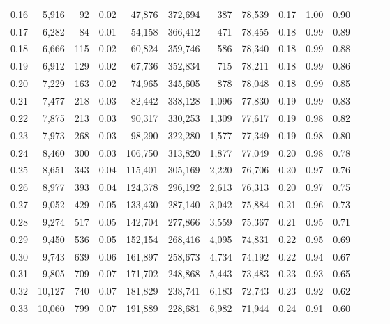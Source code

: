 \begin{tabular}{rrrrrrrrrrrrrr}
0.16 &   5,916 &     92 &  0.02 &   47,876 &  372,694 &     387 &  78,539 &  0.17 &  1.00 &      0.90 \\
0.17 &   6,282 &     84 &  0.01 &   54,158 &  366,412 &     471 &  78,455 &  0.18 &  0.99 &      0.89 \\
0.18 &   6,666 &    115 &  0.02 &   60,824 &  359,746 &     586 &  78,340 &  0.18 &  0.99 &      0.88 \\
0.19 &   6,912 &    129 &  0.02 &   67,736 &  352,834 &     715 &  78,211 &  0.18 &  0.99 &      0.86 \\
0.20 &   7,229 &    163 &  0.02 &   74,965 &  345,605 &     878 &  78,048 &  0.18 &  0.99 &      0.85 \\
0.21 &   7,477 &    218 &  0.03 &   82,442 &  338,128 &   1,096 &  77,830 &  0.19 &  0.99 &      0.83 \\
0.22 &   7,875 &    213 &  0.03 &   90,317 &  330,253 &   1,309 &  77,617 &  0.19 &  0.98 &      0.82 \\
0.23 &   7,973 &    268 &  0.03 &   98,290 &  322,280 &   1,577 &  77,349 &  0.19 &  0.98 &      0.80 \\
0.24 &   8,460 &    300 &  0.03 &  106,750 &  313,820 &   1,877 &  77,049 &  0.20 &  0.98 &      0.78 \\
0.25 &   8,651 &    343 &  0.04 &  115,401 &  305,169 &   2,220 &  76,706 &  0.20 &  0.97 &      0.76 \\
0.26 &   8,977 &    393 &  0.04 &  124,378 &  296,192 &   2,613 &  76,313 &  0.20 &  0.97 &      0.75 \\
0.27 &   9,052 &    429 &  0.05 &  133,430 &  287,140 &   3,042 &  75,884 &  0.21 &  0.96 &      0.73 \\
0.28 &   9,274 &    517 &  0.05 &  142,704 &  277,866 &   3,559 &  75,367 &  0.21 &  0.95 &      0.71 \\
0.29 &   9,450 &    536 &  0.05 &  152,154 &  268,416 &   4,095 &  74,831 &  0.22 &  0.95 &      0.69 \\
0.30 &   9,743 &    639 &  0.06 &  161,897 &  258,673 &   4,734 &  74,192 &  0.22 &  0.94 &      0.67 \\
0.31 &   9,805 &    709 &  0.07 &  171,702 &  248,868 &   5,443 &  73,483 &  0.23 &  0.93 &      0.65 \\
0.32 &  10,127 &    740 &  0.07 &  181,829 &  238,741 &   6,183 &  72,743 &  0.23 &  0.92 &      0.62 \\
0.33 &  10,060 &    799 &  0.07 &  191,889 &  228,681 &   6,982 &  71,944 &  0.24 &  0.91 &      0.60 \\

\end{tabular}
